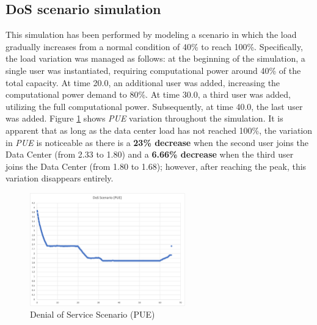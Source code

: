 \subsection{DoS scenario simulation}
This simulation has been performed by modeling a scenario in which the load gradually increases from a normal condition of 40\% to reach 100\%. Specifically, the load variation was managed as follows: at the beginning of the simulation, a single user was instantiated, requiring computational power around 40\% of the total capacity. At time 20.0, an additional user was added, increasing the computational power demand to 80\%. At time 30.0, a third user was added, utilizing the full computational power. Subsequently, at time 40.0, the last user was added. Figure \ref{fig:dos_pue} shows \emph{PUE} variation throughout the simulation. It is apparent that as long as the data center load has not reached 100\%, the variation in \emph{PUE} is noticeable as there is a \textbf{23\% decrease} when the second user joins the Data Center (from 2.33 to 1.80) and a \textbf{6.66\% decrease} when the third user joins the Data Center (from 1.80 to 1.68); however, after reaching the peak, this variation disappears entirely. 
\begin{figure}[h]
    \centering
    \includegraphics[width=0.6\textwidth]{chapters/images/dos_pue.png}
    \caption{Denial of Service Scenario (PUE)}
    \label{fig:dos_pue}
\end{figure}

